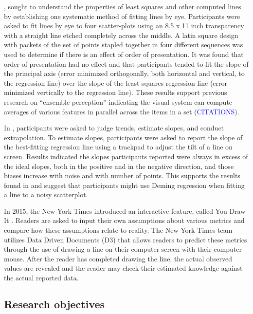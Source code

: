 \documentclass[12pt]{article}
\begin{document}
\citet{mosteller1981eye}, sought to understand the properties of least
squares and other computed lines by establishing one systematic method
of fitting lines by eye. Participants were asked to fit lines by eye to
four scatter-plots using an 8.5 x 11 inch transparency with a straight
line etched completely across the middle. A latin square design with
packets of the set of points stapled together in four different
sequences was used to determine if there is an effect of order of
presentation. It was found that order of presentation had no effect and
that participants tended to fit the slope of the principal axis (error
minimized orthogonally, both horizontal and vertical, to the regression
line) over the slope of the least squares regression line (error
minimized vertically to the regression line). These results support
previous research on ``ensemble perception'' indicating the visual
system can compute averages of various features in parallel across the
items in a set ({\textcolor{blue}{CITATIONS}}).

In \citet{ciccione2021can}, participants were asked to judge trends,
estimate slopes, and conduct extrapolation. To estimate slopes,
participants were asked to report the slope of the best-fitting
regression line using a trackpad to adjust the tilt of a line on screen.
Results indicated the slopes participants reported were always in excess
of the ideal slopes, both in the positive and in the negative direction,
and those biases increase with noise and with number of points. This
supports the results found in \citet{mosteller1981eye} and suggest that
participants might use Deming regression when fitting a line to a noisy
scatterplot.

In 2015, the New York Times introduced an interactive feature, called
You Draw It
\citep{aisch_cox_quealy_2015, buchanan_park_pearce_2017, katz_2017}.
Readers are asked to input their own assumptions about various metrics
and compare how these assumptions relate to reality. The New York Times
team utilizes Data Driven Documents (D3) that allows readers to predict
these metrics through the use of drawing a line on their computer screen
with their computer mouse. After the reader has completed drawing the
line, the actual observed values are revealed and the reader may check
their estimated knowledge against the actual reported data.

\hypertarget{research-objectives}{%
\subsection{Research objectives}\label{research-objectives}}
\end{document}
